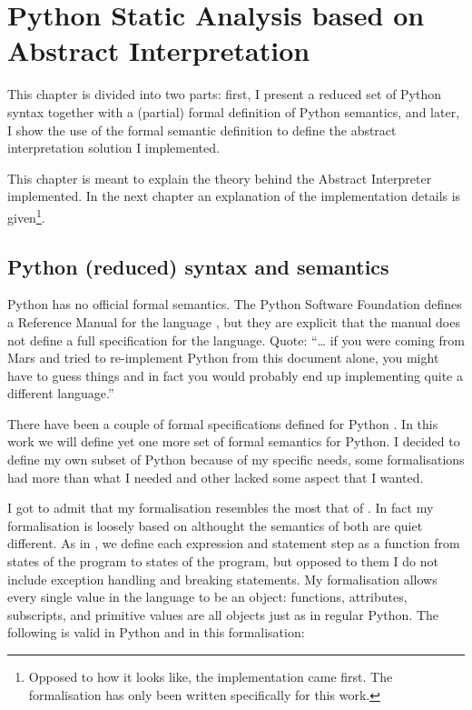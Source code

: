 \chapter{Python Static Analysis based on Abstract Interpretation}%
\label{appendix-ai-theory}


This chapter is divided into two parts: first, I present a reduced set
of Python syntax together with a (partial) formal definition of Python
semantics, and later, I show the use of the formal semantic definition
to define the abstract interpretation solution I implemented.

This chapter is meant to explain the theory behind the Abstract
Interpreter implemented. In the next chapter an explanation of the
implementation details is given\footnote{Opposed to how it looks like,
  the implementation came first. The formalisation has only been written
  specifically for this work.}.

\section{Python (reduced) syntax and semantics}%
\label{python-reduced-syntax-and-semantics}

Python has no official formal semantics. The Python Software Foundation
defines a Reference Manual for the language
\autocite{python_software_foundation_python_2019}, but they are explicit
that the manual does not define a full specification for the language.
Quote: \enquote{\ldots{} if you were coming from Mars and tried to
re-implement Python from this document alone, you might have to guess
things and in fact you would probably end up implementing quite a
different language.}

There have been a couple of formal specifications defined for Python
\autocites{politz_python_2013}{fromherz_static_2018}{guth_formal_2013}{ranson_semantics_2008}.
In this work we will define yet one more set of formal semantics for
Python. I{} decided to define my own subset of Python
because of my specific needs, some formalisations had more than what I
needed and other lacked some aspect that I wanted.

I got to admit that my formalisation resembles the most that of
\textcite{fromherz_static_2018}. In fact my formalisation is loosely
based on \textcite{fromherz_static_2018} althought the semantics of both
are quiet different. As in \textcite{fromherz_static_2018}, we define
each expression and statement step as a function from states of the
program to states of the program, but opposed to them I do not include
exception handling and breaking statements. My formalisation allows
every single value in the language to be an object: functions,
attributes, subscripts, and primitive values are all objects just as in
regular Python. The following is valid in Python and in this
formalisation:

